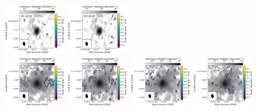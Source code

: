 \begin{figure}[htbp!]
  \includegraphics[width=0.24\textwidth]{./moment0/Set3_ID03_CH3OCH3_259311.pdf}
  \includegraphics[width=0.24\textwidth]{./moment0/Set3_ID03_CH3CN_257527.pdf}
  \\
  \includegraphics[width=0.24\textwidth]{./moment0/Set3_ID00_2_CH3OH_243915.pdf}
  \includegraphics[width=0.24\textwidth]{./moment0/Set3_ID00_2_CH3OCHO_259342.pdf}
  \includegraphics[width=0.24\textwidth]{./moment0/Set3_ID00_2_CH3OCH3_259311.pdf}
  \includegraphics[width=0.24\textwidth]{./moment0/Set3_ID00_2_CH3CN_257527.pdf}
  \\
  \caption{}
\end{figure}
\addtocounter{figure}{-1}
